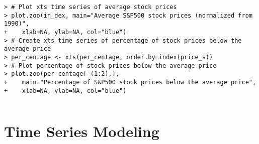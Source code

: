 \documentclass[10pt]{beamer}\usepackage[]{graphicx}\usepackage[]{color}
\makeatletter
\newenvironment{kframe}{%
 \def\at@end@of@kframe{}%
 \ifinner\ifhmode%
  \def\at@end@of@kframe{\end{minipage}}%
  \begin{minipage}{\columnwidth}%
 \fi\fi%
 \def\FrameCommand##1{\hskip\@totalleftmargin \hskip-\fboxsep
 \colorbox{shadecolor}{##1}\hskip-\fboxsep
     \hskip-\linewidth \hskip-\@totalleftmargin \hskip\columnwidth}%
 \MakeFramed {\advance\hsize-\width
   \@totalleftmargin\z@ \linewidth\hsize
   \@setminipage}}%
 {\par\unskip\endMakeFramed%
 \at@end@of@kframe}
\newenvironment{knitrout}{}{} %
\makeatother
\begin{document}
\begin{frame}[fragile,t]{\subsecname}
\begin{block}{}
\begin{columns}[T]
\begin{knitrout}
\begin{kframe}
\begin{verbatim}
> # Plot xts time series of average stock prices
> plot.zoo(in_dex, main="Average S&P500 stock prices (normalized from 1990)",
+    xlab=NA, ylab=NA, col="blue")
> # Create xts time series of percentage of stock prices below the average price
> per_centage <- xts(per_centage, order.by=index(price_s))
> # Plot percentage of stock prices below the average price
> plot.zoo(per_centage[-(1:2),],
+    main="Percentage of S&P500 stock prices below the average price",
+    xlab=NA, ylab=NA, col="blue")
\end{verbatim}
\end{kframe}
\end{knitrout}
  \end{columns}
\end{block}

\end{frame}



\section{Time Series Modeling}


\end{document}
